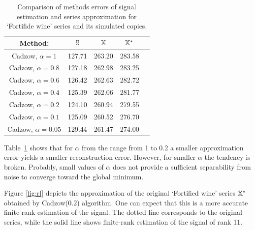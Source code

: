 \documentclass[sii]{ipart}
\begin{document}
%
%

\begin{table}
	\caption{Comparison of methods errors of signal estimation and series approximation for `Fortifide wine' series and its simulated copies.}
\label{tab:rltable}
	
	\begin{tabular*}{\textwidth}{@{\extracolsep{\fill}}ccccc}
		\hline
		Method: & $\mathbb{S}$ & $\mathbb{X}$ & $\mathbb{X}^*$ \\
		\hline
		\hline
		Cadzow, $\alpha = 1$ & 127.71 & 263.20 & 283.58 \\
		\hline
		Cadzow, $\alpha = 0.8$ & 127.18 & 262.98 & 283.25 \\
		\hline
		Cadzow, $\alpha = 0.6$ & 126.42 & 262.63 & 282.72 \\
		\hline
		Cadzow, $\alpha = 0.4$ & 125.39 & 262.06 & 281.77 \\
		\hline
		Cadzow, $\alpha = 0.2$ & 124.10 & 260.94 & 279.55 \\
		\hline
		\hline
		Cadzow, $\alpha = 0.1$ & 125.09 & 260.52 & 276.70 \\
		\hline
		Cadzow, $\alpha = 0.05$ & 129.44 & 261.47 & 274.00 \\
		\hline
	\end{tabular*}
\end{table}

Table~\ref{tab:rltable} shows that for $\alpha$ from the range from 1 to 0.2
a smaller approximation error yields a smaller reconstruction error. However, for smaller $\alpha$
the tendency is broken. Probably, small values of $\alpha$ does not provide a sufficient separability from noise
to converge toward the global minimum. 


Figure \ref{fig:rl} depicts the approximation of the original `Fortified wine' series $\mathbb{X}^*$ obtained by Cadzow($0.2$) algorithm. 
One can expect that this is a more accurate finite-rank estimation of the signal.
The dotted line corresponds to the original series, while the solid line shows finite-rank estimation of the signal of rank 11.
\end{document}
